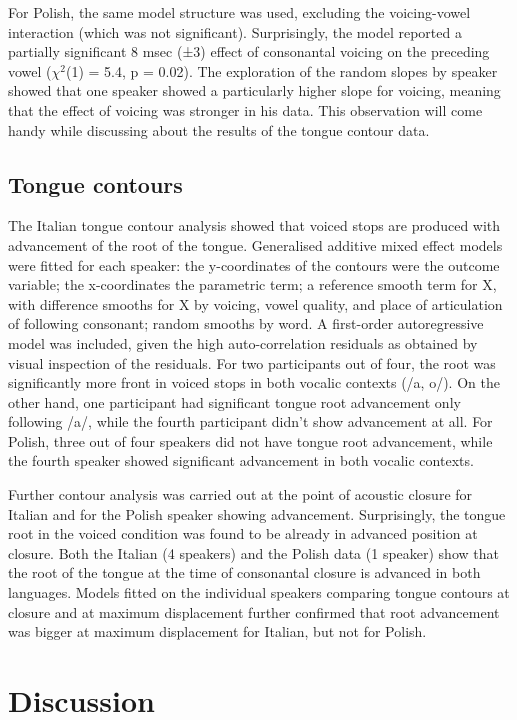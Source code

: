 \documentclass[authoryear]{elsarticle}
\begin{document}
For Polish, the same model structure was used, excluding the
voicing-vowel interaction (which was not significant). Surprisingly, the
model reported a partially significant 8 msec (±3) effect of consonantal
voicing on the preceding vowel (\(\chi^2\)(1) = 5.4, p = 0.02). The
exploration of the random slopes by speaker showed that one speaker
showed a particularly higher slope for voicing, meaning that the effect
of voicing was stronger in his data. This observation will come handy
while discussing about the results of the tongue contour data.

\subsection{Tongue contours}\label{tongue-contours}

The Italian tongue contour analysis showed that voiced stops are
produced with advancement of the root of the tongue. Generalised
additive mixed effect models were fitted for each speaker: the
y-coordinates of the contours were the outcome variable; the
x-coordinates the parametric term; a reference smooth term for X, with
difference smooths for X by voicing, vowel quality, and place of
articulation of following consonant; random smooths by word. A
first-order autoregressive model was included, given the high
auto-correlation residuals as obtained by visual inspection of the
residuals. For two participants out of four, the root was significantly
more front in voiced stops in both vocalic contexts (/a, o/). On the
other hand, one participant had significant tongue root advancement only
following /a/, while the fourth participant didn't show advancement at
all. For Polish, three out of four speakers did not have tongue root
advancement, while the fourth speaker showed significant advancement in
both vocalic contexts.

Further contour analysis was carried out at the point of acoustic
closure for Italian and for the Polish speaker showing advancement.
Surprisingly, the tongue root in the voiced condition was found to be
already in advanced position at closure. Both the Italian (4 speakers)
and the Polish data (1 speaker) show that the root of the tongue at the
time of consonantal closure is advanced in both languages. Models fitted
on the individual speakers comparing tongue contours at closure and at
maximum displacement further confirmed that root advancement was bigger
at maximum displacement for Italian, but not for Polish.

\section{Discussion}\label{discussion}
\end{document}
